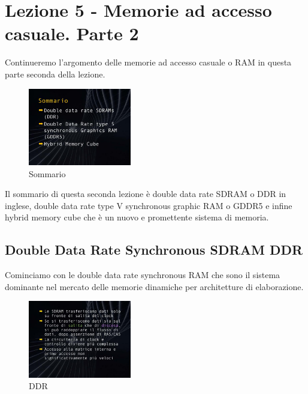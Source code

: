 \chapter{Lezione 5 - Memorie ad accesso casuale. Parte 2}

Continueremo l'argomento delle memorie ad accesso casuale o RAM in questa parte seconda della lezione.

\FloatBarrier
\begin{figure}[H]
  \centering
  \includegraphics[width=0.40\textwidth,
                    trim=40 80 10 40, %
                    clip]
                    {images/Lez05_p01_fig_02.png}
  \caption{Sommario}
  \label{fig:Lez05_p01_fig_02}
\end{figure}
\FloatBarrier
\noindent

Il sommario di questa seconda lezione è double data rate SDRAM o DDR in inglese, double data rate type V synchronous graphic RAM o GDDR5 e infine hybrid memory cube che è un nuovo e promettente sistema di memoria.

\section{Double Data Rate Synchronous SDRAM DDR}

Cominciamo con le double data rate synchronous RAM che sono il sistema dominante nel mercato delle memorie dinamiche per architetture di elaborazione.

\FloatBarrier
\begin{figure}[H]
  \centering
  \includegraphics[width=0.40\textwidth,
                    trim=40 80 10 40, %
                    clip]
                    {images/Lez05_p01_fig_04.png}
  \caption{DDR}
  \label{fig:Lez05_p01_fig_04}
\end{figure}
\FloatBarrier
\noindent

